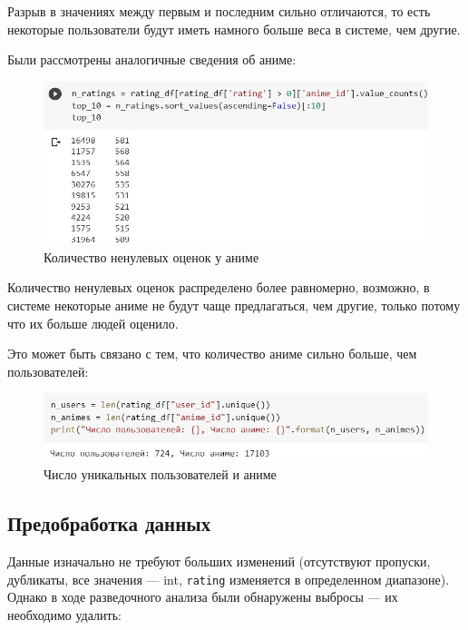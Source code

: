 \documentclass[bachelor, och, diploma]{SCWorks}
\begin{document}
Разрыв в значениях между первым и последним сильно отличаются, то есть некоторые
 пользователи будут иметь намного больше веса в системе, чем другие.

Были рассмотрены аналогичные сведения об аниме:

\begin{figure}[H]

	\centering
	
	\includegraphics[width=0.8\linewidth]{analis6.png}
	
	\caption{Количество ненулевых оценок у аниме}
	
	\label{fig:a6}
	
\end{figure}

Количество ненулевых оценок распределено более равномерно, возможно, в системе некоторые аниме не будут чаще предлагаться,
 чем другие, только потому что их больше людей оценило.

Это может быть связано с тем, что количество аниме сильно больше, чем пользователей:

\begin{figure}[h]

	\centering
	
	\includegraphics[width=0.8\linewidth]{analis7.png}
	
	\caption{Число уникальных пользователей и аниме}
	
	\label{fig:a7}
	
\end{figure}


\subsection{Предобработка данных}
Данные изначально не требуют больших изменений (отсутствуют пропуски, дубликаты, все значения --- int, \verb|rating| изменяется в определенном диапазоне). Однако в ходе разведочного анализа 
были обнаружены выбросы --- их необходимо удалить:
\end{document}
